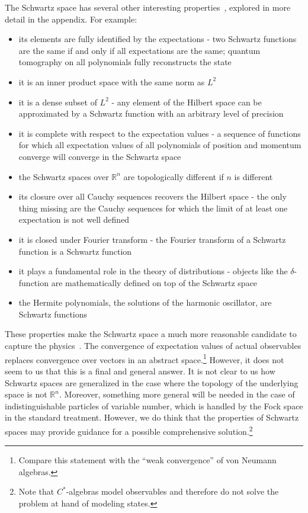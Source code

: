 \documentclass[10pt,twocolumn, nofootinbib]{revtex4-2}
\begin{document}
The Schwartz space has several other interesting properties~\cite{moretti_spectral_2017, reed_methods_1980, hall_quantum_2013, rauch_solution_1991}, explored in more detail in the appendix. For example:

\begin{itemize}
\item its elements are fully identified by the expectations - two Schwartz functions are the same if and only if all expectations are the same; quantum tomography on all polynomials fully reconstructs the state
\item it is an inner product space with the same norm as $L^2$
\item it is a dense subset of $L^2$ - any element of the Hilbert space can be approximated by a Schwartz function with an arbitrary level of precision
\item it is complete with respect to the expectation values - a sequence of functions for which all expectation values of all polynomials of position and momentum converge will converge in the Schwartz space
\item the Schwartz spaces over $\mathbb{R}^{n}$ are topologically different if $n$ is different
\item its closure over all Cauchy sequences recovers the Hilbert space - the only thing missing are the Cauchy sequences for which the limit of at least one expectation is not well defined
\item it is closed under Fourier transform - the Fourier transform of a Schwartz function is a Schwartz function
\item it plays a fundamental role in the theory of distributions - objects like the $\delta$-function are mathematically defined on top of the Schwartz space
\item the Hermite polynomials, the solutions of the harmonic oscillator, are Schwartz functions
\end{itemize}
These properties make the Schwartz space a much more reasonable candidate to capture the physics~\cite{albert2022bosonic}. The convergence of expectation values of actual observables replaces convergence over vectors in an abstract space.\footnote{Compare this statement with the ``weak convergence'' of von Neumann algebras.} However, it does not seem to us that this is a final and general answer. It is not clear to us how Schwartz spaces are generalized in the case where the topology of the underlying space is not $\mathbb{R}^n$. Moreover, something more general will be needed in the case of indistinguishable particles of variable number, which is handled by the Fock space in the standard treatment. However, we do think that the properties of Schwartz spaces may provide guidance for a possible comprehensive solution.\footnote{Note that $C^*$-algebras model observables and therefore do not solve the problem at hand of modeling states.}
\end{document}
